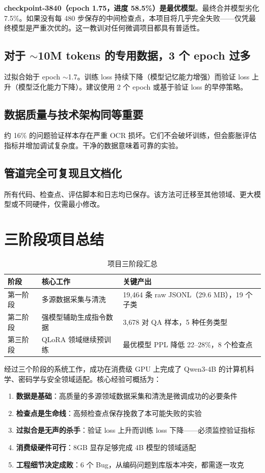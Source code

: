 \documentclass[12pt,a4paper]{ctexart}
\begin{document}
\textbf{checkpoint-3840（epoch 1.75，进度 58.5\%）是最优模型}。最终合并模型劣化 7.5\%。如果没有每 480 步保存的中间检查点，本项目将几乎完全失败——仅凭最终模型是严重次优的。这一教训对任何微调项目都具有普适性。

\subsection{对于 $\sim$10M tokens 的专用数据，3 个 epoch 过多}

过拟合始于 epoch $\sim$1.7。训练 loss 持续下降（模型记忆能力增强）而验证 loss 上升（模型泛化能力下降）。建议使用 2 个 epoch 或基于验证 loss 的早停策略。

\subsection{数据质量与技术架构同等重要}

约 16\% 的问题验证样本存在严重 OCR 损坏。它们不会破坏训练，但会膨胀评估指标并增加调试复杂度。干净的数据意味着可靠的实验。

\subsection{管道完全可复现且文档化}

所有代码、检查点、评估脚本和日志均已保存。该方法可迁移至其他领域、更大模型或不同硬件，仅需最小修改。

\section{三阶段项目总结}

\begin{table}[htbp]\centering
\caption{项目三阶段汇总}
\begin{tabular}{@{}lll@{}}
\toprule
\textbf{阶段} & \textbf{核心工作} & \textbf{关键产出} \\
\midrule
第一阶段 & 多源数据采集与清洗 & 19,464 条 raw JSONL（29.6 MB），19 个子类 \\
第二阶段 & 强模型辅助生成指令数据 & 3,678 对 QA 样本，5 种任务类型 \\
第三阶段 & QLoRA 领域继续预训练 & 最优模型 PPL 降低 22--28\%，8 个检查点 \\
\bottomrule
\end{tabular}
\end{table}

经过三个阶段的系统工作，成功在消费级 GPU 上完成了 Qwen3-4B 的计算机科学、密码学与安全领域适配。核心经验可概括为：

\begin{enumerate}[nosep]
    \item \textbf{数据是基础}：高质量的多源领域数据采集和清洗是微调成功的必要条件
    \item \textbf{检查点是生命线}：高频检查点保存挽救了本可能失败的实验
    \item \textbf{过拟合是无声的杀手}：验证 loss 上升而训练 loss 下降——必须监控验证指标
    \item \textbf{消费级硬件可行}：8GB 显存足够完成 4B 模型的领域适配
    \item \textbf{工程细节决定成败}：6 个 Bug，从编码问题到库版本冲突，都需逐一攻克
\end{enumerate}
\end{document}
